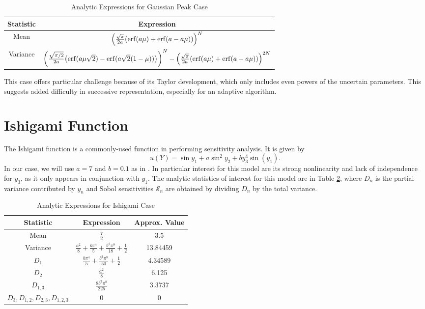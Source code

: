 \begin{table}[H]
  \centering
  \begin{tabular}{c|c}
    Statistic & Expression \\ \hline
    Mean & $\qty(\frac{\sqrt{\pi}}{2a}\qty(\erf(a\mu)+\erf(a-a\mu)))^N$ \\
    Variance & $\qty(\frac{\sqrt{\pi/2}}{2a}\qty(\erf(a\mu\sqrt{2})-\erf(a\sqrt{2}(1-\mu))))^N - \qty(\frac{\sqrt{\pi}}{2a}\qty(\erf(a\mu)+\erf(a-a\mu)))^{2N}$
  \end{tabular}
  \caption{Analytic Expressions for Gaussian Peak Case}
  \label{tab:gausspeak moments}
\end{table}
This case offers particular challenge because of its Taylor development, which only includes even powers of
the uncertain parameters.  This suggests added difficulty in successive representation, especially for an
adaptive algorithm.


\section{Ishigami Function}\label{mod:ishigami}
The Ishigami function \cite{ishigami} is a commonly-used function in performing sensitivity analysis.  It is
given by
\begin{equation}
  u(Y) = \sin{y_1} + a\sin^2{y_2} + b y_3^4\sin(y_1).
\end{equation}
In our case, we will use $a=7$ and $b=0.1$ as in \cite{ishigami2}.  In particular interest for this model are
its strong nonlinearity and lack of independence for $y_3$, as it only appears in conjunction with $y_1$.  The
analytic statistics of interest for this model are in Table \ref{tab:ishigami moments}, where $D_n$ is the
partial variance contributed by $y_n$ and Sobol sensitivities $\mathcal{S}_n$ are obtained by dividing $D_n$
by the total variance.

\begin{table}[H]
  \centering
  \begin{tabular}{c|c|c}
  Statistic & Expression & Approx. Value \\\hline
  Mean & $\frac{7}{2}$ & 3.5 \\
  Variance & $\frac{a^2}{8} + \frac{b\pi^4}{5} + \frac{b^2\pi^8}{18} + \frac{1}{2}$ & 13.84459 \\
  $D_1$ & $\frac{b\pi^4}{5} + \frac{b^2\pi^8}{50} + \frac{1}{2} $ &  4.34589 \\
  $D_2$ & $\frac{a^2}{8}$ & 6.125 \\
  $D_{1,3}$ & $\frac{8b^2\pi^8}{225}$ & 3.3737 \\
  $D_3,D_{1,2},D_{2,3},D_{1,2,3}$ & 0 & 0
  \end{tabular}
  \caption{Analytic Expressions for Ishigami Case}
  \label{tab:ishigami moments}
\end{table}


